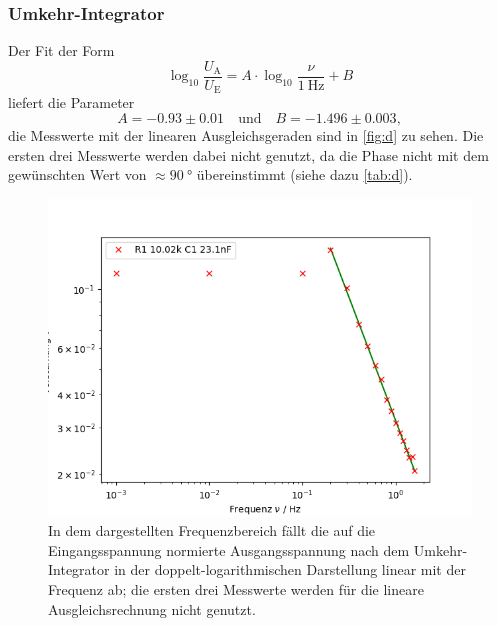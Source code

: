 \subsubsection{Umkehr-Integrator}

Der Fit der Form
\begin{equation}
	\log_{10} \frac{U_\text{A}}{U_\text{E}} = A \cdot \log_{10} \frac{\nu}{\SI{1}{\hertz}} + B
\end{equation}
liefert die Parameter
\begin{equation}
	A = -0.93 \pm 0.01 \quad \text{und} \quad B = -1.496 \pm 0.003,
\end{equation}
die Messwerte mit der linearen Ausgleichsgeraden sind in \autoref{fig:d} zu sehen. Die ersten drei Messwerte werden dabei nicht genutzt, da die Phase nicht mit dem gewünschten Wert von $\approx \SI{90}{\degree}$ übereinstimmt (siehe dazu \autoref{tab:d}).
\begin{figure}[h]
	\centering
	\includegraphics[width=\textwidth]{img/d.png}
	\caption{In dem dargestellten Frequenzbereich fällt die auf die Eingangsspannung normierte Ausgangsspannung nach dem Umkehr-Integrator in der doppelt-logarithmischen Darstellung linear mit der Frequenz ab; die ersten drei Messwerte werden für die lineare Ausgleichsrechnung nicht genutzt.}
	\label{fig:d}
\end{figure}
